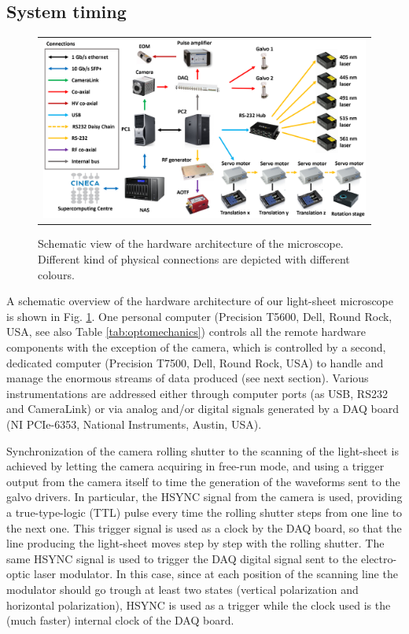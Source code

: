 \documentclass[12pt]{spieman}  %
\begin{document}
\subsection{System timing}
\label{sec:timing}

	\begin{figure}
   \begin{center}
   \begin{tabular}{c}
   \includegraphics[width=\textwidth]{connectivity.eps}
   \end{tabular}
   \end{center}
   \caption{\label{fig:connectivity} Schematic view of the hardware architecture of the microscope. Different kind of physical connections are depicted with different colours.} 
   \end{figure}

A schematic overview of the hardware architecture of our light-sheet microscope is shown in Fig. \ref{fig:connectivity}. One personal computer (Precision T5600, Dell, Round Rock, USA, see also Table \ref{tab:optomechanics}) controls all the remote hardware components with the exception of the camera, which is controlled by a second, dedicated computer (Precision T7500, Dell, Round Rock, USA) to handle and manage the enormous streams of data produced (see next section). Various instrumentations are addressed either through computer ports (as USB, RS232 and CameraLink) or via analog and/or digital signals generated by a DAQ board (NI PCIe-6353, National Instruments, Austin, USA).

Synchronization of the camera rolling shutter to the scanning of the light-sheet is achieved by letting the camera acquiring in free-run mode, and using a trigger output from the camera itself to time the generation of the waveforms sent to the galvo drivers. In particular, the HSYNC signal from the camera is used, providing a true-type-logic (TTL) pulse every time the rolling shutter steps from one line to the next one. This trigger signal is used as a clock by the DAQ board, so that the line producing the light-sheet moves step by step with the rolling shutter. The same HSYNC signal is used to trigger the DAQ digital signal sent to the electro-optic laser modulator. In this case, since at each position of the scanning line the modulator should go trough at least two states (vertical polarization and horizontal polarization), HSYNC is used as a trigger while the clock used is the (much faster) internal clock of the DAQ board.
\end{document}
